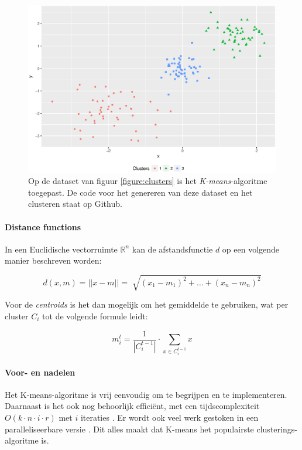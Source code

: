 \begin{figure}
\centering
\caption{Op de dataset van figuur \ref{figure:clusters} is het \emph{K-means}-algoritme toegepast. De code voor het genereren van deze dataset en het clusteren staat op Github.}
\label{figure:clusters_kmeans}
\includegraphics[width=\textwidth]{res/ch4_kmeans_after.eps}
\end{figure}

\paragraph{Distance functions}
In een Euclidische vectorruimte $\mathds{R}^n$ kan de afstandsfunctie $d$ op een volgende manier beschreven worden:

\begin{equation}
d(x,m)=||x-m||=\sqrt[]{\left(x_1-m_1\right)^2+\dots+\left(x_n-m_n\right)^2}
\end{equation}

Voor de \emph{centroids} is het dan mogelijk om het gemiddelde te gebruiken, wat per cluster $C_i$ tot de volgende formule leidt:

\begin{equation}
m_i^{t} = \frac{1}{|C_i^{t-1}|}\cdot \sum_{x\in C_i^{t-1}}{x}
\end{equation}

%
\paragraph{Voor- en nadelen}
Het K-means-algoritme is vrij eenvoudig om te begrijpen en te implementeren. Daarnaast is het ook nog behoorlijk effici\"ent, met een tijdscomplexiteit $O\left(k\cdot n \cdot i \cdot r \right)$ met $i$ iteraties \cite{jin2011k}. Er wordt ook veel werk gestoken in een paralleliseerbare versie \cite{zhao2009parallel}. Dit alles maakt dat K-means het populairste clusterings-algoritme is.

